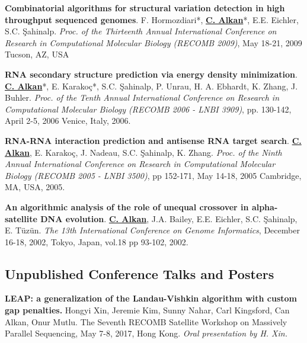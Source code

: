 
\vspace{-.2cm}
{\bf  Combinatorial algorithms for structural variation detection in high throughput sequenced genomes}.
F. Hormozdiari*, {\bf {\underline{C. Alkan}}}*, E.E. Eichler, S.C. \c{S}ahinalp.
{\em Proc. of the
 Thirteenth Annual International Conference on Research in Computational Molecular 
Biology (RECOMB 2009)}, May 18-21, 2009 Tucson, AZ, USA

\vspace{-.2cm}
{\bf RNA secondary structure prediction via energy density minimization}.
{\bf {\underline{C. Alkan}}}*, E. Karako\c{c}*, S.C. \c{S}ahinalp, P. Unrau,
H. A. Ebhardt, K. Zhang, J. Buhler.
{\em Proc. of the Tenth Annual International Conference on Research in Computational Molecular Biology
  (RECOMB 2006 - LNBI 3909)}, pp. 130-142,
  April 2-5, 2006 Venice, Italy, 2006.


\vspace{-.2cm}
 {\bf RNA-RNA interaction prediction and antisense RNA target search}.
  {\bf {\underline{C. Alkan}}}, E. Karako\c{c}, J. Nadeau, S.C. \c{S}ahinalp,
  K. Zhang.
  {\em Proc. of the Ninth Annual International Conference on Research in Computational Molecular Biology
    (RECOMB 2005 - LNBI 3500)}, pp 152-171, 
    May 14-18, 2005 Cambridge, MA, USA, 2005.


    
\vspace{-.2cm}
 {\bf An algorithmic analysis of the role of unequal crossover in
  alpha-satellite DNA evolution}.
  {\bf {\underline{C. Alkan}}}, J.A. Bailey, E.E. Eichler, S.C. \c{S}ahinalp, E. T\"{u}z\"{u}n.
{\em The 13th International Conference on Genome Informatics}, 
December 16-18, 2002, Tokyo, Japan, vol.18 pp 93-102, 2002.

\vspace{-.4cm}
\subsection{\small \sc  Unpublished Conference Talks and Posters}

\vspace{-.2cm}
       {\bf LEAP: a generalization of the Landau-Vishkin algorithm with custom gap penalties.} Hongyi Xin, Jeremie Kim, Sunny Nahar, Carl Kingsford, Can Alkan, Onur Mutlu.
       The Seventh RECOMB Satellite Workshop on Massively Parallel Sequencing, May 7-8, 2017, Hong Kong.
       {\it Oral presentation by H. Xin.}


